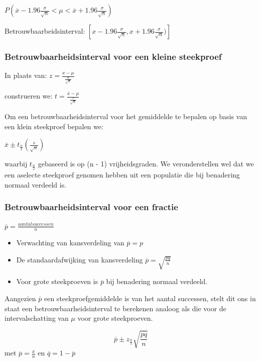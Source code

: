 \documentclass[a4paper,12pt]{article}
\begin{document}
$P(\overline{x} - 1.96\frac{\sigma}{\sqrt{n}} < \mu < \overline{x}+1.96\frac{\sigma}{\sqrt{n}})$

Betrouwbaarbeidsinterval: $[x - 1.96\frac{\sigma}{\sqrt{n}} , x+1.96\frac{\sigma}{\sqrt{n}})]$

\subsubsection{Betrouwbaarheidsinterval voor een kleine steekproef}
In plaats van:
$z = \frac{x - \mu}{\frac{\sigma}{\sqrt{n}}}$

construeren we:
$t=\frac{\overline{x}-\mu}{\frac{s}{\sqrt{n}}}$

Om een betrouwbaarheidsinterval voor het gemiddelde te bepalen
op basis van een klein steekproef bepalen we:

$\overline{x} \pm t_{\frac{\alpha}{2}}(\frac{s}{\sqrt{n}})$

waarbij $t_{\frac{\alpha}{2}}$ gebaseerd is op (n - 1) vrijheidsgraden.
We veronderstellen wel dat we een aselecte steekproef genomen hebben uit een populatie die bij benadering normaal verdeeld is.

\subsubsection{Betrouwbaarheidsinterval voor een fractie}
$\overline{p}=\frac{aantal successen}{n}$

\begin{itemize}
\item Verwachting van kansverdeling van $\overline{p} = p$
\item De standaardafwijking van kansverdeling $\overline{p} = \sqrt{\frac{pq}{n}}$
\item Voor grote steekproeven is $\overline{p}$ bij benadering normaal verdeeld.
\end{itemize}
Aangezien $\overline{p}$ een steekproefgemiddelde is van het aantal successen, stelt dit ons in staat een betrouwbaarheidsinterval te berekenen analoog als die voor de intervalschatting van $\mu$ voor grote steekproeven.

\begin{equation}
\overline{p} \pm z_{\frac{\alpha}{2}}\sqrt{\frac{\overline{pq}}{n}}
\end{equation}
met $\overline{p} = \frac{x}{n}$ en $\overline{q}= 1-\overline{p}$
\end{document}
